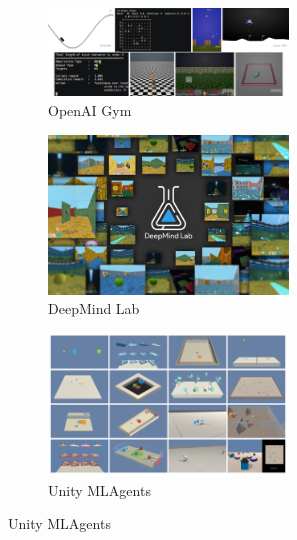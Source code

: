 
\begin{figure}[h!]
	\centering
	\begin{subfigure}[b]{0.3\textwidth}
		\centering
		\includegraphics[width=0.7\textwidth]{figures/existing_envs/openai_gym}
		\caption{OpenAI Gym}
		\label{fig:openai_gym}
	\end{subfigure}
	\hfill
	\begin{subfigure}[b]{0.3\textwidth}
		\centering
		\includegraphics[width=0.7\textwidth]{figures/existing_envs/deepmind_lab.png}
		\caption{DeepMind Lab}
		\label{fig:deepmind_lab}
	\end{subfigure}
	\hfill
	\begin{subfigure}[b]{0.3\textwidth}
		\centering
		\includegraphics[width=0.7\textwidth]{figures/existing_envs/unity_mlagents.png}
		\caption{Unity MLAgents}
		\label{fig:unity_mlagents}
	\end{subfigure}
	\hfill
	

\end{figure}
